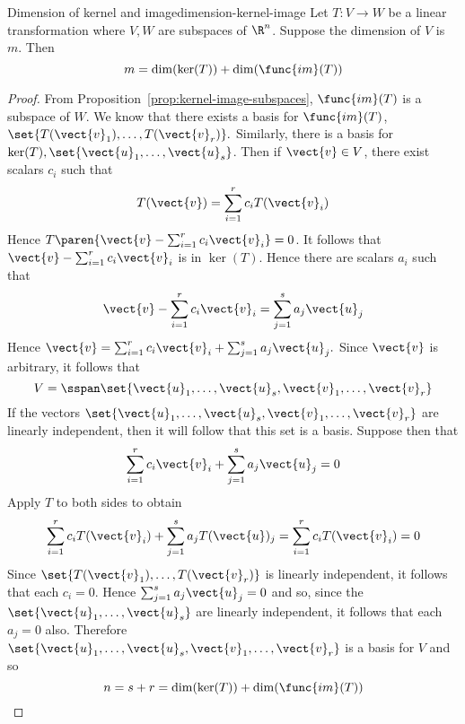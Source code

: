 \begin{theorem}{Dimension of kernel and image}{dimension-kernel-image}
Let $T:V\rightarrow W$ be a linear transformation where $V,W$ are subspaces of $\R^n$. Suppose the dimension of $V$ is $m$. Then
\[
m=\dim (\ker (T)) +\dim (\func{im}(
T))
\]
\end{theorem}

\begin{proof}
From Proposition~\ref{prop:kernel-image-subspaces}, $\func{im}(T) $ is a subspace of $W$. We know that there exists a basis for $\func{im}(T)$, $\set{T(\vect{v}
_{1}),\ldots,T(\vect{v}_{r})} . $ Similarly, there is a basis for $\ker
(T) ,\set{\vect{u}_{1},\ldots,\vect{u}_{s}}$. Then if $
\vect{v}\in V$, there exist scalars $c_{i}$ such that
\begin{equation*}
T(\vect{v})=\sum_{i=1}^{r}c_{i}T(\vect{v}_{i})
\end{equation*}
Hence $T\paren{\vect{v}-\sum_{i=1}^{r}c_{i}\vect{v}_{i}} =0$. It follows
that $\vect{v}-\sum_{i=1}^{r}c_{i}\vect{v}_{i}$ is in $\ker (T)$.
Hence there are scalars $a_{i}$ such that
\begin{equation*}
\vect{v}-\sum_{i=1}^{r}c_{i}\vect{v}_{i}=\sum_{j=1}^{s}a_{j}\vect{u}_{j}
\end{equation*}
Hence $\vect{v}=\sum_{i=1}^{r}c_{i}\vect{v}_{i}+\sum_{j=1}^{s}a_{j}\vect{u}
_{j}. $ Since $\vect{v}$ is arbitrary, it follows that
\begin{equation*}
V=\sspan\set{\vect{u}_{1},\ldots,\vect{u}_{s},\vect{v}_{1},\ldots,
\vect{v}_{r}}
\end{equation*}
If the vectors $\set{\vect{u}_{1},\ldots,\vect{u}_{s},\vect{v}_{1},\ldots,
\vect{v}_{r}} $ are linearly independent, then it will follow that
this set is a basis. Suppose then that
\begin{equation*}
\sum_{i=1}^{r}c_{i}\vect{v}_{i}+\sum_{j=1}^{s}a_{j}\vect{u}_{j}=0
\end{equation*}
Apply $T$ to both sides to obtain
\begin{equation*}
\sum_{i=1}^{r}c_{i}T(\vect{v}_{i})+\sum_{j=1}^{s}a_{j}T(\vect{u})
_{j}=\sum_{i=1}^{r}c_{i}T(\vect{v}_{i})=0
\end{equation*}
Since $\set{T(\vect{v}_{1}),\ldots,T(\vect{v}_{r})} $ is linearly
independent, it follows that each $c_{i}=0$. Hence $\sum_{j=1}^{s}a_{j}\vect{u
}_{j}=0$ and so, since the $\set{\vect{u}_{1},\ldots,\vect{u}_{s}} $
are linearly independent, it follows that each $a_{j}=0$ also. Therefore $\set{\vect{u}_{1},\ldots,\vect{u}_{s},\vect{v}_{1},\ldots,\vect{v}
_{r}} $ is a basis for $V$ and so
\begin{equation*}
n=s+r=\dim (\ker (T)) +\dim (\func{im}(
T))
\end{equation*}
\end{proof}

